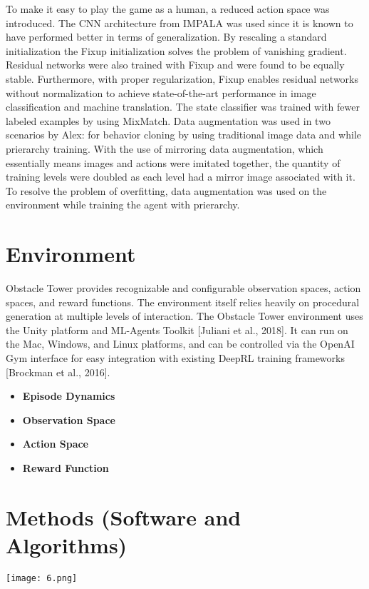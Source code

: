 \documentclass[conference]{IEEEtran}
\begin{document}
To make it easy to play the game as a human, a reduced action space was introduced.  The CNN architecture from IMPALA was used since it is known to have performed better in terms of generalization. By rescaling a standard initialization the Fixup initialization solves the problem of vanishing gradient. Residual networks were also trained with Fixup and were found to be equally stable. Furthermore, with proper regularization, Fixup enables residual networks without normalization to achieve state-of-the-art performance in image classification and machine translation. The state classifier was trained with fewer labeled examples by using MixMatch.
Data augmentation was used in two scenarios by Alex: for behavior cloning by using traditional image data and while prierarchy training. With the use of mirroring data augmentation, which essentially means images and actions were imitated together, the quantity of training levels were doubled as each level had a mirror image associated with it. To resolve the problem of overfitting, data augmentation was used on the environment while training the agent with prierarchy. 


\section{Environment}
Obstacle Tower provides recognizable and configurable observation spaces, action spaces, and reward functions. The environment itself relies heavily on procedural generation at multiple levels of interaction. The Obstacle Tower environment uses the Unity platform and ML-Agents Toolkit [Juliani et al., 2018]. It can run on the Mac, Windows, and Linux platforms, and can be controlled via the OpenAI Gym interface for easy integration with existing DeepRL training frameworks [Brockman et al., 2016].

\begin{itemize}
	\item \textbf{Episode Dynamics}
	\item \textbf{Observation Space}
	\item \textbf{Action Space}
	\item \textbf{Reward Function}
\end{itemize}

\section{Methods (Software and Algorithms)}

\begin{figure*}
  \texttt{[image: 6.png]}
\end{figure*}
\end{document}
